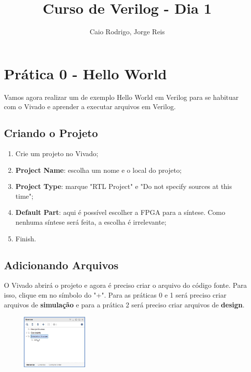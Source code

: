 \documentclass[a4paper]{article}
\title{Curso de Verilog - Dia 1}
\author{Caio Rodrigo, Jorge Reis}
\date{} %
\begin{document}
\maketitle

\section*{Prática 0 - Hello World}

Vamos agora realizar um de exemplo Hello World em Verilog para se habituar com o Vivado e aprender a executar arquivos em Verilog.

\subsection*{Criando o Projeto}

\begin{enumerate}
\item Crie um projeto no Vivado;
\item \textbf{Project Name}: escolha um  nome e o local do projeto;
\item \textbf{Project Type}: marque "RTL Project" e "Do not specify sources at this time";
\item \textbf{Default Part}: aqui é possível escolher a FPGA para a síntese. Como nenhuma síntese será feita, a escolha é irrelevante;
\item Finish. 
\end{enumerate}

\subsection*{Adicionando Arquivos}
O Vivado abrirá o projeto e agora é preciso criar o arquivo do código fonte. Para isso, clique em no símbolo do "+". Para as práticas 0 e 1 será preciso criar arquivos de \textbf{simulação} e para a prática 2 será preciso criar arquivos de \textbf{design}.

\begin{figure}[ht]
\centering
\includegraphics[width=0.3\textwidth]{images/addfile.jpg}
\end{figure}
\end{document}
